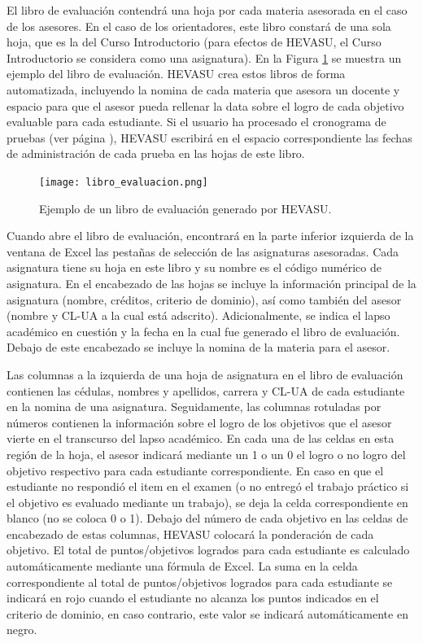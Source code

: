 \documentclass[letterpaper,12pt]{book}
\begin{document}
El libro de evaluación contendrá una hoja por cada materia asesorada en el caso de los asesores. En el caso de los orientadores, este libro constará de una sola hoja, que es la del Curso Introductorio (para efectos de HEVASU, el Curso Introductorio se considera como una asignatura). En la Figura \ref{fig:libro_evaluacion} se muestra un ejemplo del libro de evaluación. HEVASU crea estos libros de forma automatizada, incluyendo la nomina de cada materia que asesora un docente y espacio para que el asesor pueda rellenar la data sobre el logro de cada objetivo evaluable para cada estudiante. Si el usuario ha procesado el cronograma de pruebas (ver página \pageref{sec:cronograma}), HEVASU escribirá en el espacio correspondiente las fechas de administración de cada prueba en las hojas de este libro.

\begin{figure}[!ht]
  \centering
  \texttt{[image: libro\_evaluacion.png]}
  \caption{Ejemplo de un libro de evaluación generado por HEVASU.}
  \label{fig:libro_evaluacion}
\end{figure}

Cuando abre el libro de evaluación, encontrará en la parte inferior izquierda de la ventana de Excel las pestañas de selección de las asignaturas asesoradas. Cada asignatura tiene su hoja en este libro y su nombre es el código numérico de asignatura. En el encabezado de las hojas se incluye la información principal de la asignatura (nombre, créditos, criterio de dominio), así como también del asesor (nombre y CL-UA a la cual está adscrito). Adicionalmente, se indica el lapso académico en cuestión y la fecha en la cual fue generado el libro de evaluación.  Debajo de este encabezado se incluye la nomina de la materia para el asesor.

Las columnas a la izquierda de una hoja de asignatura en el libro de evaluación contienen las cédulas, nombres y apellidos, carrera y CL-UA de cada estudiante en la nomina de una asignatura. Seguidamente, las columnas rotuladas por números contienen la información sobre el logro de los objetivos que el asesor vierte en el transcurso del lapso académico. En cada una de las celdas en esta región de la hoja, el asesor indicará mediante un 1 o un 0 el logro o no logro del objetivo respectivo para cada estudiante correspondiente. En caso en que el estudiante no respondió el item en el examen (o no entregó el trabajo práctico si el objetivo es evaluado mediante un trabajo), se deja la celda correspondiente en blanco (no se coloca 0 o 1).  Debajo del número de cada objetivo en las celdas de encabezado de estas columnas, HEVASU colocará la ponderación de cada objetivo.  El total de puntos/objetivos logrados para cada estudiante es calculado automáticamente mediante una fórmula de Excel. La suma en la celda correspondiente al total de puntos/objetivos logrados para cada estudiante se indicará en rojo cuando el estudiante no alcanza los puntos indicados en el criterio de dominio, en caso contrario, este valor se indicará automáticamente en negro.
\end{document}
